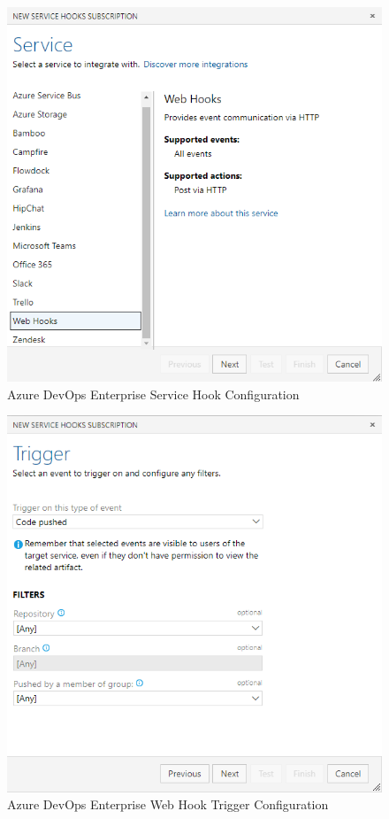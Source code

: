 \begin{figure}[h]
    \includegraphics[width=\textwidth]{graphics/adoe-service-hooks-sub.png}
    \caption{Azure DevOps Enterprise Service Hook Configuration}
    \label{fig:adoe-hook-config}
\end{figure}

\begin{figure}[h]
    \includegraphics[width=\textwidth]{graphics/adoe-hook-trigger-config.png}
    \caption{Azure DevOps Enterprise Web Hook Trigger Configuration}
    \label{fig:adoe-trigger-config}
\end{figure}

